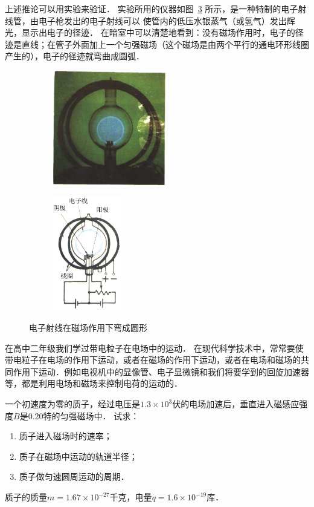 上述推论可以用实验来验证．
实验所用的仪器如图~\ref{fig_C_0-1} 所示，是一种特制的电子射线管，由电子枪发出的电子射线可以
使管内的低压水银蒸气（或氢气）发出辉光，显示出电子的径迹．
在暗室中可以清楚地看到：没有磁场作用时，电子的径迹是直线；在管子外面加上一个匀强磁场（这个磁场是由两个平行的通电环形线圈产生的），电子的径迹就弯曲成圆弧．
\begin{figure}[htbp]
	\centering
	\begin{subfigure}{0.46\linewidth}
		\centering
		\includegraphics[height=5cm]{fig/C/0-0.pdf}
		\caption{}\label{fig_C_0-1a}
	\end{subfigure}
	\hfil
	\begin{subfigure}{0.46\linewidth}
		\centering
		\includegraphics[height=5cm]{fig/C/0-1.pdf}
		\caption{}\label{fig_C_0-1b}
	\end{subfigure}
	\caption{电子射线在磁场作用下弯成圆形}\label{fig_C_0-1}
\end{figure}


在高中二年级我们学过带电粒子在电场中的运动．
在现代科学技术中，常常要使带电粒子在电场的作用下运动，或者在磁场的作用下运动，或者在电场和磁场的共同作用下运动．例如电视机中的显像管、电子显微镜和我们将要学到的回旋加速器等，都是利用电场和磁场来控制电荷的运动的．

\begin{example}
    一个初速度为零的质子，经过电压是$1.3\times10^3$伏的电场加速后，垂直进入磁感应强度$B$是0.20特的匀强磁场中．
    试求：
    \begin{enumerate}
        \item 质子进入磁场时的速率；
        \item 质子在磁场中运动的轨道半径；
        \item 质子做匀速圆周运动的周期．
    \end{enumerate}
质子的质量$m=1.67\times10^{-27}$千克，电量$q=1.6\times10^{-19}$库．
\end{example}

